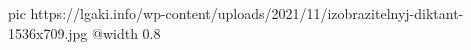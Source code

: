  
 
 
 
 

\ifcmt
  pic https://lgaki.info/wp-content/uploads/2021/11/izobrazitelnyj-diktant-1536x709.jpg
  @width 0.8
\fi
